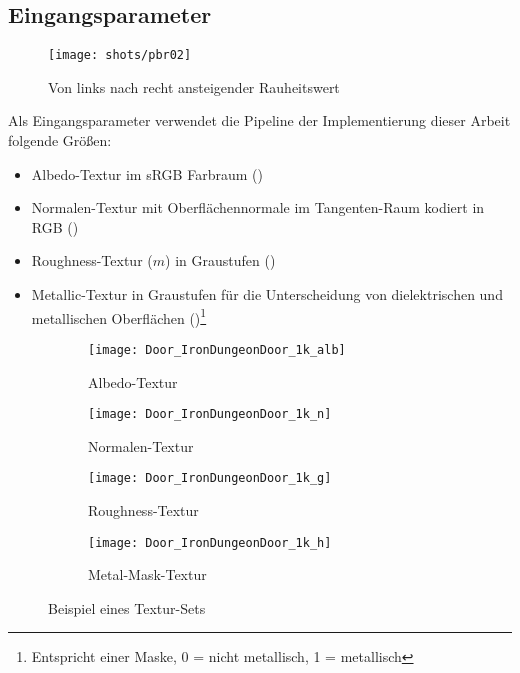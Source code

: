 \subsection{Eingangsparameter}

\begin{figure}
\centering
	\texttt{[image: shots/pbr02]}
	\caption{Von links nach recht ansteigender Rauheitswert}
	\label{fig:pbr-roughness}
\end{figure}

Als Eingangsparameter verwendet die Pipeline der Implementierung dieser Arbeit folgende Größen:
\begin{itemize}
\item Albedo-Textur im sRGB Farbraum ()
\item Normalen-Textur mit Oberflächennormale im Tangenten-Raum kodiert in RGB ()
\item Roughness-Textur ($m$) in Graustufen ()
\item Metallic-Textur in Graustufen für die Unterscheidung von dielektrischen und metallischen Oberflächen ()\footnote{Entspricht einer Maske, 0 = nicht metallisch, 1 = metallisch}
\end{itemize}

\begin{figure}
\centering
\begin{subfigure}{0.24\textwidth}
	\texttt{[image: Door\_IronDungeonDoor\_1k\_alb]}
	\caption{Albedo-Textur}\label{fig:pbr-albedo-tex}
\end{subfigure}
\begin{subfigure}{0.24\textwidth}
	\texttt{[image: Door\_IronDungeonDoor\_1k\_n]}
	\caption{Normalen-Textur}\label{fig:pbr-normale-tex}
\end{subfigure}
\begin{subfigure}{0.24\textwidth}
	\texttt{[image: Door\_IronDungeonDoor\_1k\_g]}
	\caption{Roughness-Textur}\label{fig:pbr-roughness-tex}
\end{subfigure}
\begin{subfigure}{0.24\textwidth}
	\texttt{[image: Door\_IronDungeonDoor\_1k\_h]}
	\caption{Metal-Mask-Textur}\label{fig:pbr-metalmask-tex}
\end{subfigure}
\caption{Beispiel eines Textur-Sets}
\label{fig:pbr-texturen}
\end{figure}


